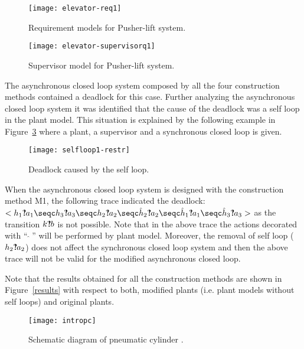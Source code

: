 \documentclass[a4paper,english,final]{article}
\theoremstyle{plain}
\theoremstyle{definition}
\newcommand{\com}{\ensuremath{?\mkern-6mu!}}
\begin{document}
\begin{figure}\centering
\texttt{[image: elevator-req1]}
\caption{Requirement models for Pusher-lift system.} \label{pushlift-req}
\end{figure}
\begin{figure}\centering
\texttt{[image: elevator-supervisorq1]}
\caption{Supervisor model for Pusher-lift system.}\label{sup-pl}
\end{figure}

The asynchronous closed loop system composed by all the four construction methods contained a deadlock for this case. Further analyzing the asynchronous closed loop system it was identified that the cause of the deadlock was a self loop in the plant model. This situation is explained by the following example in Figure~\ref{restr1} where a plant, a supervisor and a synchronous closed loop is given.
\begin{figure}\centering
\texttt{[image: selfloop1-restr]}\\
  \caption{Deadlock caused by the self loop.}\label{restr1}
\end{figure}

When the asynchronous closed loop system is designed with the construction method M1, the following trace indicated the deadlock: $<h_1\com a_1\seqc h_3\com a_3\seqc h_2\com a_2\seqc\hat{h}_2\com a_2\seqc\hat{h}_1\com a_1\seqc\hat{h}_3\com a_3>$ as the transition $k\com b$ is not possible. Note that in the above trace the actions decorated with ``$\;\hat{ }\;$'' will be performed by plant model. Moreover, the removal of self loop ($h_2\com a_2$) does not affect the synchronous closed loop system and then the above trace will not be valid for the modified asynchronous closed loop.

Note that the results obtained for all the construction methods are shown in Figure~\ref{results} with respect to both, modified plants (i.e. plant models without self loops) and original plants.

\begin{figure}\centering
\texttt{[image: intropc]}
\caption{Schematic diagram of pneumatic cylinder .}\label{intro-pc}
\end{figure}
\end{document}
